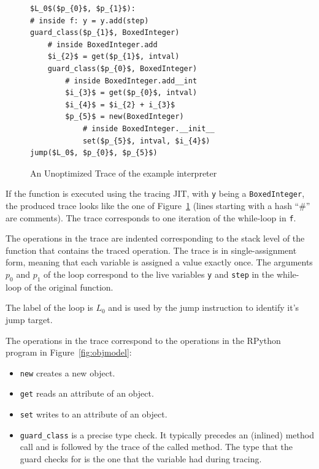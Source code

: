 \documentclass[preprint]{sigplanconf}
\begin{document}
\begin{figure}
\begin{lstlisting}[mathescape,numbers = right,basicstyle=\setstretch{1.05}\ttfamily\scriptsize]
$L_0$($p_{0}$, $p_{1}$):
# inside f: y = y.add(step)
guard_class($p_{1}$, BoxedInteger)
    # inside BoxedInteger.add
    $i_{2}$ = get($p_{1}$, intval)
    guard_class($p_{0}$, BoxedInteger)
        # inside BoxedInteger.add__int
        $i_{3}$ = get($p_{0}$, intval)
        $i_{4}$ = $i_{2} + i_{3}$
        $p_{5}$ = new(BoxedInteger)
            # inside BoxedInteger.__init__
            set($p_{5}$, intval, $i_{4}$)
jump($L_0$, $p_{0}$, $p_{5}$)
\end{lstlisting}
\caption{An Unoptimized Trace of the example interpreter}
\label{fig:unopt-trace}
\end{figure}

If the function is executed using the tracing JIT, with \lstinline{y} being a
\lstinline{BoxedInteger}, the produced trace looks like the one of
Figure~\ref{fig:unopt-trace} (lines starting with a hash ``\#'' are comments).
The trace corresponds to one iteration of the while-loop in \lstinline{f}.

The operations in the trace are indented
corresponding to the stack level of the function that contains the traced
operation. The trace is in single-assignment form, meaning that each variable is
assigned a value exactly once. The arguments $p_0$ and $p_1$ of the loop correspond
to the live variables \lstinline{y} and \lstinline{step} in the while-loop of
the original function.

The label of the loop is $L_0$ and is used by the jump instruction to
identify it's jump target.

The operations in the trace correspond to the operations in the RPython program
in Figure~\ref{fig:objmodel}:

\begin{itemize}
    \item \lstinline{new} creates a new object.
    \item \lstinline{get} reads an attribute of an object.
    \item \lstinline{set} writes to an attribute of an object.
    \item \lstinline{guard_class} is a precise type check. It typically precedes
    an (inlined) method call and is followed by the trace of the called method.
    The type that the guard checks for is the one that the variable had during
    tracing.
\end{itemize}
\end{document}
